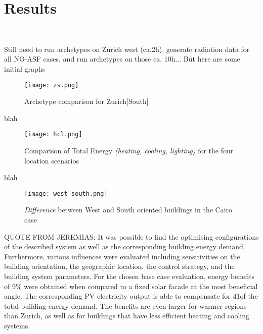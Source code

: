 
\chapter{Results}\
\label{ch:results}

Still need to run archetypes on Zurich west (ca.2h), generate radiation data for all NO-ASF cases, and run archetypes on those ca. 10h... But here are some initial graphs

\begin{figure}[h] %
  \begin{center}
    \texttt{[image: zs.png]}
    \caption{Archetype comparison for Zurich[South]}
    \label{fig: zs}
  \end{center} 
\end{figure}

blah\par

\begin{figure}[h] %
  \begin{center}
    \texttt{[image: hcl.png]}
    \caption{Comparison of Total Energy \textit{(heating, cooling, lighting)} for the four location scenarios}
    \label{fig: ASF}
  \end{center} 
\end{figure}

blah\par

\begin{figure}[h] %
  \begin{center}
    \texttt{[image: west-south.png]}
    \caption{\textit{Difference} between West and South oriented buildings in the Cairo case}
    \label{fig: ASF}
  \end{center} 
\end{figure}

QUOTE FROM JEREMIAS: It was possible to find the optimising configurations of the described system as well as the corresponding building energy demand. Furthermore, various influences were evaluated including sensitivities on the building orientation, the geographic location, the control strategy, and the building system parameters. For the chosen base case evaluation, energy benefits of 9\% were obtained when compared to a fixed solar facade at the most beneficial angle. The corresponding PV electricity output is able to compensate for 41\percent of the total building energy demand. The benefits are even larger for warmer regions than Zurich, as well as for buildings that have less efficient heating and cooling systems.\par